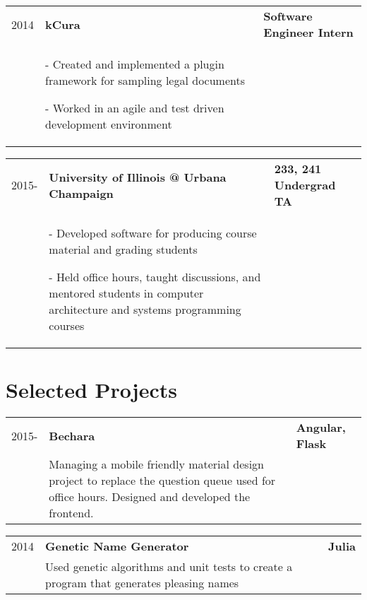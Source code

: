 \documentclass[letterpaper,10pt]{article}
\begin{document}
\begin{minipage}[t][0em][t]{0.8\textwidth}
\begin{tabular}{p{} p{} p{}}
  
  {2014} & \textbf{kCura} & \textbf{\small Software Engineer Intern}\\
  & {- Created and implemented a plugin framework for sampling legal documents

- Worked in an agile and test driven development environment} & \\
\end{tabular}

\begin{tabular}{p{} p{} p{}}
  
  {2015-} & \textbf{University of Illinois @ Urbana Champaign} & \textbf{\small 233, 241 Undergrad TA}\\
  & {- Developed software for producing course material and grading students

- Held office hours, taught discussions, and mentored students in computer architecture and systems programming courses} & \\
\end{tabular}
  



\section*{\huge Selected Projects}


\begin{tabular}{p{} p{} p{}}
  
  {2015-} & \textbf{Bechara} & \textbf{\small Angular, Flask}\\
  & {Managing a mobile friendly material design project to replace the question queue used for office hours. Designed and developed the frontend.} & \\
\end{tabular}

\begin{tabular}{p{} p{} p{}}
  
  {2014} & \textbf{Genetic Name Generator} & \textbf{\small Julia}\\
  & {Used genetic algorithms and unit tests to create a program that generates pleasing names} & \\
\end{tabular}
  
\begin{tabular}{p{} p{} p{}}
  

\end{tabular}
\end{minipage}
\end{document}
